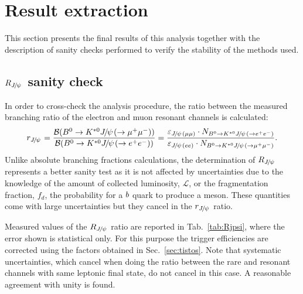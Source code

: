 \section{Result extraction}
\label{sec:RKst_result}

This section presents the final results of this analysis
together with the description of sanity checks performed to verify the stability
of the methods used.

\subsection{$R_{\jpsi}$ sanity check}
\label{sec:Rjpsi}

In order to cross-check the analysis procedure, the ratio between the
measured branching ratio of the electron and muon resonant channels is calculated:
%
\begin{equation}
r_{\jpsi} = \frac{\BR(\Bz\to\Kstarz\jpsi(\to \mumu))} {\BR(\Bz\to\Kstarz\jpsi(\to \epem))} 
= \frac{\varepsilon_{\jpsi(\mu\mu)} \cdot N_{\Bz\to\Kstarz\jpsi(\to \epem)}}{\varepsilon_{\jpsi(ee)} 
\cdot N_{\Bz\to\Kstarz\jpsi(\to \mumu)}}.
\end{equation}
%
Unlike absolute branching fractions calculations, the determination of $R_{\jpsi}$ represents a better
sanity test as it is not affected by uncertainties due to the knowledge of the amount of collected 
luminosity, $\mathcal{L}$, or the fragmentation fraction, $f_d$, the probability for a ${b}$
quark to produce a \Bz meson. These quantities come with large uncertainties but they cancel
in the $r_{\jpsi}$ ratio.

%
%


Measured values of the $R_{\jpsi}$ ratio are reported in Tab.~\ref{tab:Rjpsi}, where the error 
shown is statistical only. For this purpose the trigger efficiencies are corrected using the 
factors obtained in Sec.~\ref{sec:tistos}. Note that systematic uncertainties, 
which cancel when doing the ratio between the rare and
resonant channels with same leptonic final state, do not cancel in this case.
A reasonable agreement with unity is found.

